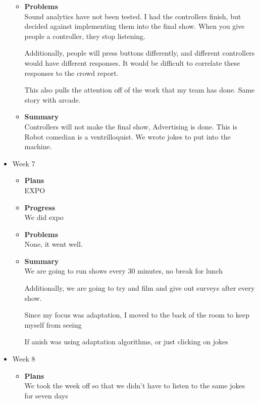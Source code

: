 \begin{itemize}
\begin{itemize}
				\item \textbf{Problems} \\
Sound analytics have not been tested. I had the controllers finish, but decided against implementing them into the final show. When you give people a controller, they stop listening. 

 

Additionally, people will press buttons differently, and different controllers would have different responses. It would be difficult to correlate these responses to the crowd report. 

 

This also pulls the attention off of the work that my team has done. Same story with arcade.
				\item \textbf{Summary} \\
					Controllers will not make the final show, Advertising is done. This is Robot comedian is a ventrilloquist. We wrote jokes to put into the machine. 
			\end{itemize}

		\item{Week 7}
			\begin{itemize}
				\item \textbf{Plans} \\
					EXPO
				\item \textbf{Progress} \\
					We did expo
				\item \textbf{Problems} \\
					None, it went well.
				\item \textbf{Summary} \\
					We are going to run shows every 30 minutes, no break for lunch 

					Additionally, we are going to try and film and give out surveys after every show. 


					Since my focus was adaptation, I moved to the back of the room to keep myself from seeing  

					If anish was using adaptation algorithms, or just clicking on jokes
			\end{itemize}

		\item{Week 8}
			\begin{itemize}
				\item \textbf{Plans} \\
					We took the week off so that we didn’t have to listen to the same jokes for seven days 
			\end{itemize}


\end{itemize}
